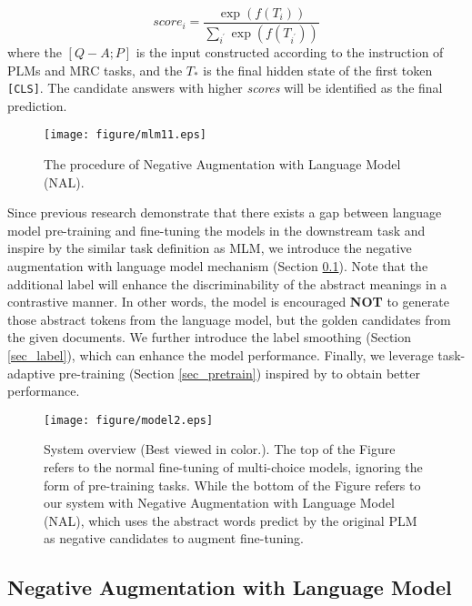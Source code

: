 \documentclass[11pt,a4paper]{article}
\begin{document}
\begin{equation}
 score _{i}=\frac{\exp \left(f\left(T_{i}\right)\right)}{\sum_{i^{\prime}} \exp \left(f\left(T_{i^{\prime}}\right)\right)}
\end{equation}
where the $[Q-A;P]$ is the input constructed according to the instruction of PLMs and MRC tasks, and the $T_*$ is the final hidden state of the first token \texttt{[CLS]}.
The candidate answers with higher \textit{scores} will be identified as the final prediction. 

\begin{figure}[ht]
    \centering
    \texttt{[image: figure/mlm11.eps]}
    \caption{The procedure of Negative Augmentation with Language Model (NAL).}
    \label{fig:NAL}
\end{figure}

Since previous research  \cite{DBLP:journals/corr/abs-2012-15723,xlnet} demonstrate that there exists a gap between language model pre-training and fine-tuning the models in the downstream task and inspire by the similar task definition as MLM, we introduce the negative augmentation with language model mechanism (Section \ref{sect:approach-gap}). Note that the additional label will enhance the discriminability of the abstract meanings in a contrastive manner. In other words, the model is encouraged \textbf{NOT} to generate those abstract tokens from the language model, but the golden candidates from the given documents.  We further introduce the label smoothing (Section \ref{sec_label}), which can enhance the model performance. Finally, we leverage task-adaptive pre-training (Section \ref{sec_pretrain}) inspired by \cite{noauthor_200410964_nodate} to obtain better performance. 

\begin{figure*}

\centering
\texttt{[image: figure/model2.eps]}
\caption{\label{font-figue} System overview (Best viewed in color.). The top of the Figure refers to the normal fine-tuning of multi-choice models, ignoring the form of pre-training tasks. 
While the bottom of the Figure refers to our system with Negative Augmentation with Language Model (NAL), which uses the abstract words predict by the original PLM as negative candidates to augment fine-tuning.}
\label{fig: model}
\end{figure*}

\subsection{Negative Augmentation with Language Model}
\label{sect:approach-gap}
\end{document}
